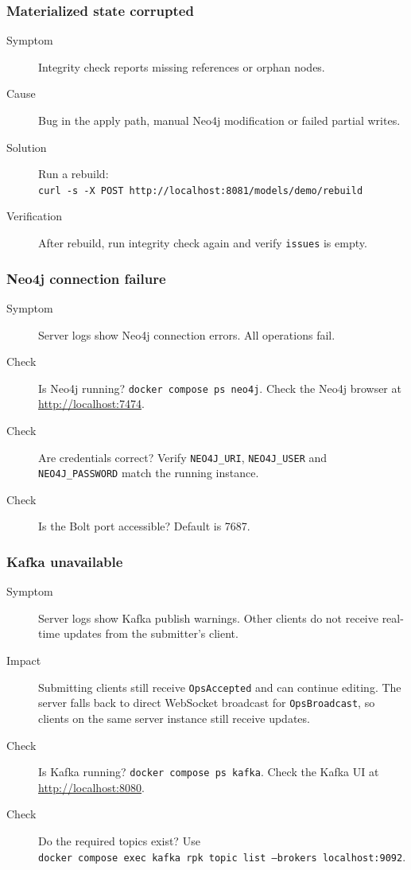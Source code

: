 \subsubsection{Materialized state corrupted}

\begin{description}
\item[Symptom] Integrity check reports missing references or orphan nodes.
\item[Cause] Bug in the apply path, manual Neo4j modification or failed
  partial writes.
\item[Solution] Run a rebuild: \\
  \texttt{curl -s -X POST http://localhost:8081/models/demo/rebuild}
\item[Verification] After rebuild, run integrity check again and verify
  \texttt{issues} is empty.
\end{description}

\subsubsection{Neo4j connection failure}

\begin{description}
\item[Symptom] Server logs show Neo4j connection errors. All operations fail.
\item[Check] Is Neo4j running? \texttt{docker compose ps neo4j}. Check the
  Neo4j browser at \url{http://localhost:7474}.
\item[Check] Are credentials correct? Verify \texttt{NEO4J\_URI},
  \texttt{NEO4J\_USER} and \texttt{NEO4J\_PASSWORD} match the running
  instance.
\item[Check] Is the Bolt port accessible? Default is 7687.
\end{description}

\subsubsection{Kafka unavailable}

\begin{description}
\item[Symptom] Server logs show Kafka publish warnings. Other clients do not
  receive real-time updates from the submitter's client.
\item[Impact] Submitting clients still receive \texttt{OpsAccepted} and can
  continue editing. The server falls back to direct WebSocket broadcast for
  \texttt{OpsBroadcast}, so clients on the same server instance still
  receive updates.
\item[Check] Is Kafka running? \texttt{docker compose ps kafka}. Check the
  Kafka UI at \url{http://localhost:8080}.
\item[Check] Do the required topics exist? Use \\
  \texttt{docker compose exec kafka rpk topic list --brokers localhost:9092}.
\end{description}

